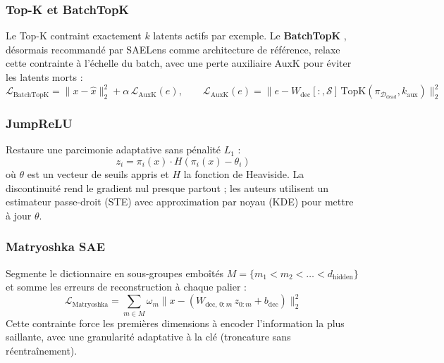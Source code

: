\documentclass[11pt]{article}
\begin{document}
\subsubsection{Top-K et BatchTopK}
Le Top-K contraint exactement $k$ latents actifs par exemple. Le
\textbf{BatchTopK} \cite{gao2024topk, bussmann2025batchtopk}, désormais
recommandé par SAELens comme architecture de référence, relaxe cette
contrainte à l'échelle du batch, avec une perte auxiliaire AuxK pour éviter
les latents morts :
\[
  \mathcal{L}_\text{BatchTopK} = \|x - \hat{x}\|_2^2 + \alpha\,\mathcal{L}_\text{AuxK}(e), \qquad
  \mathcal{L}_\text{AuxK}(e) = \bigl\|e - W_\text{dec}[:,\mathcal{S}]\,\text{TopK}(\pi_{\mathcal{D}_\text{dead}}, k_\text{aux})\bigr\|_2^2
\]

\subsubsection{JumpReLU}
Restaure une parcimonie adaptative sans pénalité $L_1$
\cite{rajamanoharan2024jumprelu} :
\[
  z_i = \pi_i(x) \cdot H(\pi_i(x) - \theta_i)
\]
où $\theta$ est un vecteur de seuils appris et $H$ la fonction de Heaviside.
La discontinuité rend le gradient nul presque partout ; les auteurs
utilisent un estimateur passe-droit (STE) avec approximation par noyau (KDE)
pour mettre à jour $\theta$.

\subsubsection{Matryoshka SAE}
Segmente le dictionnaire en sous-groupes emboîtés
$M = \{m_1 < m_2 < \dots < d_\text{hidden}\}$ et somme les erreurs de
reconstruction à chaque palier \cite{bussmann2025matryoshka} :
\[
  \mathcal{L}_\text{Matryoshka} = \sum_{m \in M} \omega_m \bigl\|x - (W_{\text{dec},\,0:m}\,z_{0:m} + b_\text{dec})\bigr\|_2^2
\]
Cette contrainte force les premières dimensions à encoder l'information la
plus saillante, avec une granularité adaptative à la clé (troncature sans
réentraînement).
\end{document}
